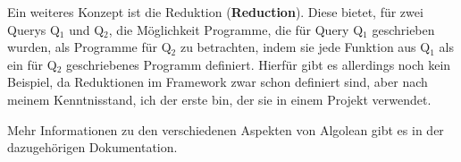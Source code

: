 Ein weiteres Konzept ist die Reduktion (\textbf{Reduction}).
Diese bietet, für zwei Querys Q$_1$ und Q$_2$, die Möglichkeit Programme, die für Query Q$_1$ geschrieben wurden, als Programme für Q$_2$ zu betrachten,
indem sie jede Funktion aus Q$_1$ als ein für Q$_2$ geschriebenes Programm definiert.
Hierfür gibt es allerdings noch kein Beispiel, da Reduktionen im Framework zwar schon definiert sind, aber nach meinem Kenntnisstand, ich der erste bin, der sie in einem Projekt verwendet.

Mehr Informationen zu den verschiedenen Aspekten von Algolean gibt es in der dazugehörigen Dokumentation\cite{algolean_doc}.
